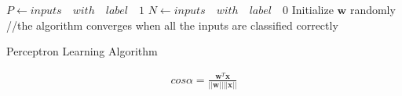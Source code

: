 \begin{frame}
	\begin{columns}

		\begin{overlayarea}{\textwidth}{\textheight}
			\begin{center}
				\begin{algorithm}[H]
					$P \leftarrow inputs\quad with \quad label \quad 1$\;
					$N \leftarrow inputs \quad with \quad label \quad 0$\;
					Initialize $\mathbf{w}$ randomly\;
					//the algorithm converges when all the inputs are classified correctly
					\caption{Perceptron Learning Algorithm}
				\end{algorithm}
				\vspace{-0.2in}

				\scriptsize{
					\begin{align*}
						cos \alpha = \frac{\mathbf{w}^T\mathbf{x}}{||\mathbf{w}||||\mathbf{x}||}
					\end{align*}
				}

			\end{center}

		\end{overlayarea}


\end{columns}
\end{frame}
